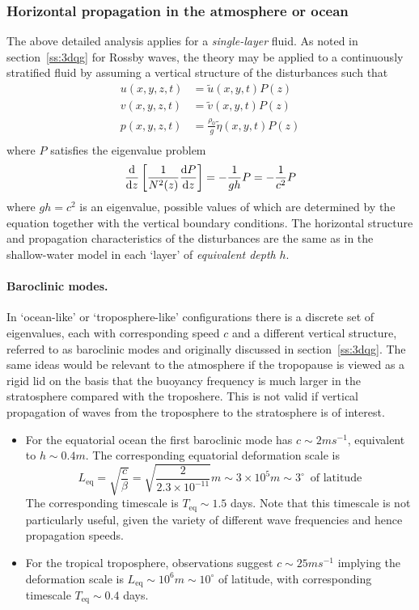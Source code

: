 \documentclass{jknotes}
\begin{document}
\subsubsection{Horizontal propagation in the atmosphere or ocean}
The above detailed analysis applies for a \emph{single-layer} fluid. As noted
in section~\ref{ss:3dqg} for Rossby waves, the theory may be applied to a
continuously stratified fluid by assuming a vertical structure of the
disturbances such that
\begin{align}
	u(x,y,z,t) &= \tilde{u}(x,y,t)P(z)\\
	v(x,y,z,t) &= \tilde{v}(x,y,t)P(z)\\
	p(x,y,z,t) &= \frac{\rho_0}{g}\tilde{\eta}(x,y,t)P(z)\\
\end{align}
where $P$ satisfies the eigenvalue problem
\begin{equation}
	\frac{\diffd}{\diffd z}\left[ \frac{1}{N^2(z)} \frac{\diffd P}{\diffd
	z}\right] = -\frac{1}{gh} P = -\frac{1}{c^2} P
	\label{eq:15.13}
\end{equation}
where $gh = c^2$ is an eigenvalue, possible values of which are determined by
the equation together with the vertical boundary conditions. The horizontal
structure and propagation characteristics of the disturbances are the same as
in the shallow-water model in each `layer' of \emph{equivalent depth} $h$.

\paragraph{Baroclinic modes.}
In `ocean-like' or `troposphere-like' configurations there is a discrete set
of eigenvalues, each with corresponding speed $c$ and a different vertical
structure, referred to as baroclinic modes and originally discussed in
section~\ref{ss:3dqg}. The same ideas would be relevant to the atmosphere if
the tropopause is viewed as a rigid lid on the basis that the buoyancy
frequency is much larger in the stratosphere compared with the troposhere.
This is not valid if vertical propagation of waves from the troposphere to the
stratosphere is of interest.

\begin{itemize}
	\item For the equatorial ocean the first baroclinic mode has $c \sim 2 m
		s^{-1}$, equivalent to $h \sim 0.4 m$. The corresponding equatorial
		deformation scale is
		\begin{equation}
			L_{\text{eq}} = \sqrt{\frac{c}{\beta}} = \sqrt{\frac{2}{2.3 \times
				10^{-11}}} m \sim 3 \times 10^5 m \sim 3^{\circ} \,\,\,\text{of
			latitude}
		\end{equation}
		The corresponding timescale is $T_{\text{eq}} \sim 1.5$ days. Note
		that this timescale is not particularly useful, given the variety of
		different wave frequencies and hence propagation speeds.
	\item For the tropical troposphere, observations suggest $c \sim 25 m
		s^{-1}$ implying the deformation scale is $L_{\text{eq}} \sim 10^6 m
		\sim 10^{\circ}$ of latitude, with corresponding timescale
		$T_{\text{eq}} \sim 0.4$ days. 
\end{itemize}
\end{document}
